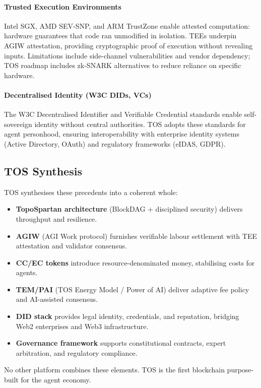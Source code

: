 \documentclass[11pt]{article}
\begin{document}
\paragraph{Trusted Execution Environments} Intel SGX, AMD SEV-SNP, and ARM TrustZone enable attested computation: hardware guarantees that code ran unmodified in isolation. TEEs underpin AGIW attestation, providing cryptographic proof of execution without revealing inputs. Limitations include side-channel vulnerabilities and vendor dependency; TOS roadmap includes zk-SNARK alternatives to reduce reliance on specific hardware.

\paragraph{Decentralised Identity (W3C DIDs, VCs)} The W3C Decentralised Identifier and Verifiable Credential standards enable self-sovereign identity without central authorities. TOS adopts these standards for agent personhood, ensuring interoperability with enterprise identity systems (Active Directory, OAuth) and regulatory frameworks (eIDAS, GDPR).

\subsection{TOS Synthesis}
TOS synthesises these precedents into a coherent whole:
\begin{itemize}[noitemsep]
  \item \textbf{TopoSpartan architecture} (BlockDAG + disciplined security) delivers throughput and resilience.
  \item \textbf{AGIW} (AGI Work protocol) furnishes verifiable labour settlement with TEE attestation and validator consensus.
  \item \textbf{CC/EC tokens} introduce resource-denominated money, stabilising costs for agents.
  \item \textbf{TEM/PAI} (TOS Energy Model / Power of AI) deliver adaptive fee policy and AI-assisted consensus.
  \item \textbf{DID stack} provides legal identity, credentials, and reputation, bridging Web2 enterprises and Web3 infrastructure.
  \item \textbf{Governance framework} supports constitutional contracts, expert arbitration, and regulatory compliance.
\end{itemize}

No other platform combines these elements. TOS is the first blockchain purpose-built for the agent economy.
\end{document}
